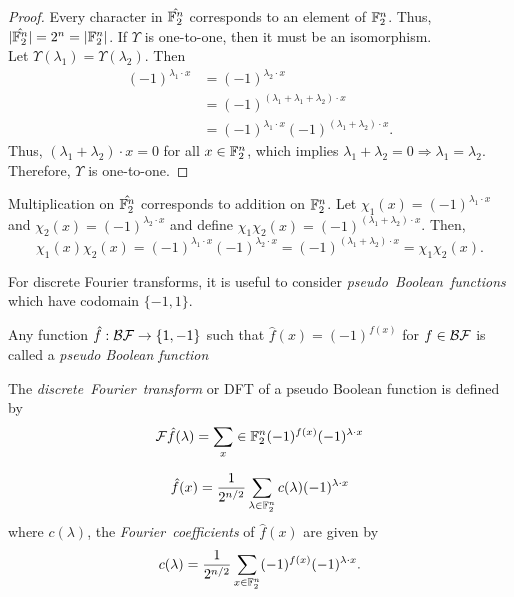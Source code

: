 \begin{proof}
	Every character in $\hat{\mathbb{F}_2^n}$ corresponds to an element of $\mathbb{F}_2^n$. Thus,
	$\lvert\hat{\mathbb{F}_2^n}\rvert=2^n=\lvert\mathbb{F}_2^n\rvert$. If $\Upsilon$ is one-to-one, then
	it must be an isomorphism.\\
	Let $\Upsilon(\lambda_1)=\Upsilon(\lambda_2)$. Then
	\begin{align*}
		(-1)^{\lambda_1\cdot x}&=(-1)^{\lambda_2\cdot x}\\
		                       &=(-1)^{(\lambda_1+\lambda_1+\lambda_2)\cdot x}\\
													 &=(-1)^{\lambda_1\cdot x}(-1)^{(\lambda_1+\lambda_2)\cdot x}.
	\end{align*}
	Thus, $(\lambda_1+\lambda_2)\cdot x=0$ for all $x\in\mathbb{F}_2^n$, which implies
	$\lambda_1+\lambda_2=0\Rightarrow\lambda_1=\lambda_2$. Therefore, $\Upsilon$ is
	one-to-one.
\end{proof}

\par Multiplication on $\hat{\mathbb{F}_2^n}$ corresponds to addition on $\mathbb{F}_2^n$. Let
$\chi_1(x)=(-1)^{\lambda_1\cdot x}$ and $\chi_2(x)=(-1)^{\lambda_2\cdot x}$ and define
$\chi_1\chi_2(x)=(-1)^{(\lambda_1+\lambda_2)\cdot x}$. Then,
\[
\chi_1(x)\chi_2(x)=(-1)^{\lambda_1\cdot x}(-1)^{\lambda_2\cdot x}=(-1)^{(\lambda_1+\lambda_2)\cdot x}=\chi_1\chi_2(x).
\]

\par For discrete Fourier transforms, it is useful to consider {\em pseudo\ Boolean\ functions}
which have codomain $\{-1,1\}$. 

\begin{definition}\label{def:pBF}
	Any function $\hat{f}:\mathcal{BF}\rightarrow\{1,-1\}$ such that $\hat{f}(x)=(-1)^{f(x)}$ for $f\in\mathcal{BF}$
	is called a {\em pseudo Boolean function}
\end{definition}

\begin{definition}\label{def:DFT}
	The {\em discrete\ Fourier\ transform} or DFT of a pseudo Boolean function is defined by
	\begin{equation}\label{eqn:DFW}
		\mathcal{F}\hat{f}(\lambda)=\sum_x\in\mathbb{F}_2^n(-1)^{f(x)}(-1)^{\lambda\cdot x}
	\end{equation}
\end{definition}

\begin{lemma}
\begin{equation}\label{eqn:DFT}
	\hat{f}(x)=\frac{1}{2^{n/2}}\sum_{\lambda\in\mathbb{F}_2^n}c(\lambda)(-1)^{\lambda\cdot x}
\end{equation}
	where $c(\lambda)$, the {\em Fourier\ coefficients} of $\hat{f}(x)$ are given by
	\[
  	c(\lambda)=\frac{1}{2^{n/2}}\sum_{x\in\mathbb{F}_2^n}(-1)^{f(x)}(-1)^{\lambda\cdot x}.
	\]
\end{lemma}

